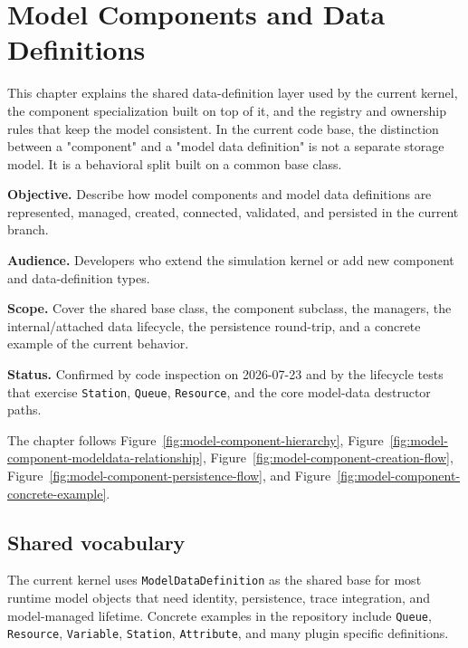 \chapter{Model Components and Data Definitions}
\label{chap:model-components-and-data-definitions}

This chapter explains the shared data-definition layer used by the current
kernel, the component specialization built on top of it, and the registry and
ownership rules that keep the model consistent. In the current code base, the
distinction between a "component" and a "model data definition" is not a
separate storage model. It is a behavioral split built on a common base class.

\noindent\textbf{Objective.} Describe how model components and model data
definitions are represented, managed, created, connected, validated, and
persisted in the current branch.

\noindent\textbf{Audience.} Developers who extend the simulation kernel or add
new component and data-definition types.

\noindent\textbf{Scope.} Cover the shared base class, the component subclass,
the managers, the internal/attached data lifecycle, the persistence round-trip,
and a concrete example of the current behavior.

\noindent\textbf{Status.} Confirmed by code inspection on 2026-07-23 and by
the lifecycle tests that exercise \texttt{Station}, \texttt{Queue}, \texttt{Resource}, and the core
model-data destructor paths.

The chapter follows Figure~\ref{fig:model-component-hierarchy},
Figure~\ref{fig:model-component-modeldata-relationship},
Figure~\ref{fig:model-component-creation-flow},
Figure~\ref{fig:model-component-persistence-flow}, and
Figure~\ref{fig:model-component-concrete-example}.

\section{Shared vocabulary}
\label{sec:model-component-shared-vocabulary}

The current kernel uses \texttt{ModelDataDefinition} as the shared base for most
runtime model objects that need identity, persistence, trace integration, and
model-managed lifetime. Concrete examples in the repository include
\texttt{Queue}, \texttt{Resource}, \texttt{Variable}, \texttt{Station}, \texttt{Attribute}, and many plugin
specific definitions.


